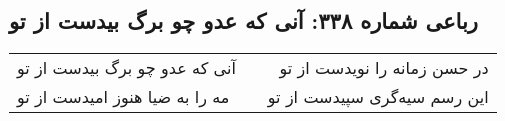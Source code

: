 \begin{center}
\section*{رباعی شماره ۳۳۸: آنی که عدو چو برگ بیدست از تو}
\label{sec:sh338}
\begin{longtable}{l p{0.5cm} r}
آنی که عدو چو برگ بیدست از تو
&&
در حسن زمانه را نویدست از تو
\\
مه را به ضیا هنوز امیدست از تو
&&
این رسم سیه‌گری سپیدست از تو
\\
\end{longtable}
\end{center}
